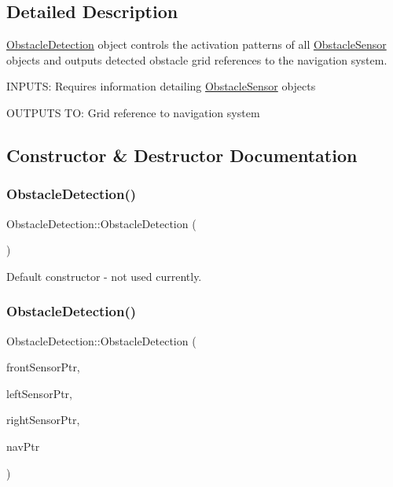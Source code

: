 \subsection{Detailed Description}
\mbox{\hyperlink{class_obstacle_detection}{Obstacle\+Detection}} object controls the activation patterns of all \mbox{\hyperlink{class_obstacle_sensor}{Obstacle\+Sensor}} objects and outputs detected obstacle grid references to the navigation system.

I\+N\+P\+U\+TS\+: Requires information detailing \mbox{\hyperlink{class_obstacle_sensor}{Obstacle\+Sensor}} objects

O\+U\+T\+P\+U\+TS TO\+: Grid reference to navigation system 

\subsection{Constructor \& Destructor Documentation}
\mbox{\label{class_obstacle_detection_a1ef460cae951b0ddaa04088645109f47}} 
\subsubsection{\texorpdfstring{Obstacle\+Detection()}{ObstacleDetection()}\hspace{0.1cm}{\footnotesize\ttfamily [1/2]}}
{\footnotesize\ttfamily Obstacle\+Detection\+::\+Obstacle\+Detection (\begin{DoxyParamCaption}{ }\end{DoxyParamCaption})}



Default constructor -\/ not used currently. 

\mbox{\label{class_obstacle_detection_ab70842be18c993b94612f17b653f3674}} 
\subsubsection{\texorpdfstring{Obstacle\+Detection()}{ObstacleDetection()}\hspace{0.1cm}{\footnotesize\ttfamily [2/2]}}
{\footnotesize\ttfamily Obstacle\+Detection\+::\+Obstacle\+Detection (\begin{DoxyParamCaption}\item[{\mbox{\hyperlink{class_obstacle_sensor}{Obstacle\+Sensor}} $\ast$}]{front\+Sensor\+Ptr,  }\item[{\mbox{\hyperlink{class_obstacle_sensor}{Obstacle\+Sensor}} $\ast$}]{left\+Sensor\+Ptr,  }\item[{\mbox{\hyperlink{class_obstacle_sensor}{Obstacle\+Sensor}} $\ast$}]{right\+Sensor\+Ptr,  }\item[{\mbox{\hyperlink{class_navigator}{Navigator}} $\ast$}]{nav\+Ptr }\end{DoxyParamCaption})}

